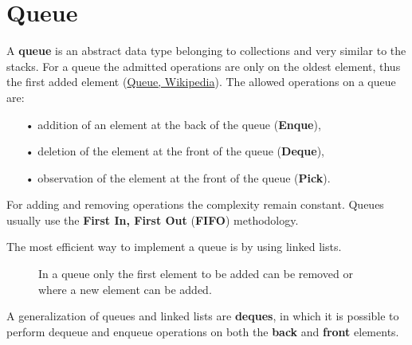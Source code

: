 \section{Queue}
\label{queue}
A \textbf{queue} is an abstract data type belonging to collections and very similar to the stacks. For a queue the admitted operations are only on the oldest element, thus the first added element \cite{wikiqueue} (\href{https://en.wikipedia.org/wiki/Queue_(abstract_data_type)}{Queue, Wikipedia}). The allowed operations on a queue are:
\begin{itemize}
\item[•] addition of an element at the back of the queue (\textbf{Enque}),
\item[•] deletion of the element at the front of the queue (\textbf{Deque}),
\item[•] observation of the element at the front of the queue (\textbf{Pick}).
\end{itemize}
For adding and removing operations the complexity remain constant. Queues usually use the \textbf{First In, First Out} (\textbf{FIFO}) methodology. 

The most efficient way to implement a queue is by using linked lists.

\begin{figure}[H]
\centering
{}
\caption[Allowed operations on queue elements.]{In a queue only the first element to be added can be removed or where a new element can be added.}
\label{queue_1}
\end{figure}

A generalization of queues and linked lists are \textbf{deques}, in which it is possible to perform dequeue and enqueue operations on both the \textbf{back} and \textbf{front} elements.

